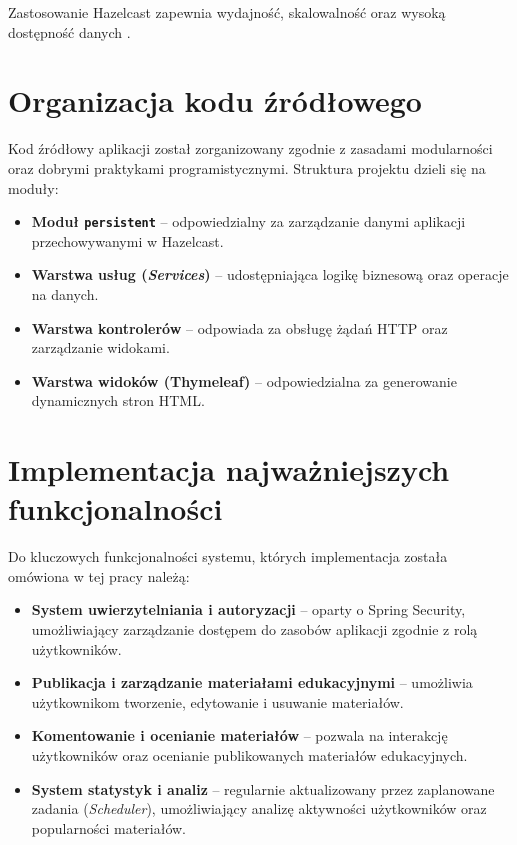 Zastosowanie Hazelcast zapewnia wydajność, skalowalność oraz wysoką dostępność danych \cite{microservices}.

\section{Organizacja kodu źródłowego}

Kod źródłowy aplikacji został zorganizowany zgodnie z zasadami modularności oraz dobrymi praktykami programistycznymi. Struktura projektu dzieli się na moduły:

\begin{itemize}
\item \textbf{Moduł \texttt{persistent}} – odpowiedzialny za zarządzanie danymi aplikacji przechowywanymi w Hazelcast.
\item \textbf{Warstwa usług (\textit{Services})} – udostępniająca logikę biznesową oraz operacje na danych.
\item \textbf{Warstwa kontrolerów} – odpowiada za obsługę żądań HTTP oraz zarządzanie widokami.
\item \textbf{Warstwa widoków (Thymeleaf)} – odpowiedzialna za generowanie dynamicznych stron HTML.
\end{itemize}

\section{Implementacja najważniejszych funkcjonalności}

Do kluczowych funkcjonalności systemu, których implementacja została omówiona w tej pracy należą:

\begin{itemize}
\item \textbf{System uwierzytelniania i autoryzacji} – oparty o Spring Security, umożliwiający zarządzanie dostępem do zasobów aplikacji zgodnie z rolą użytkowników.
\item \textbf{Publikacja i zarządzanie materiałami edukacyjnymi} – umożliwia użytkownikom tworzenie, edytowanie i usuwanie materiałów.
\item \textbf{Komentowanie i ocenianie materiałów} – pozwala na interakcję użytkowników oraz ocenianie publikowanych materiałów edukacyjnych.
\item \textbf{System statystyk i analiz} – regularnie aktualizowany przez zaplanowane zadania (\textit{Scheduler}), umożliwiający analizę aktywności użytkowników oraz popularności materiałów.
\end{itemize}

